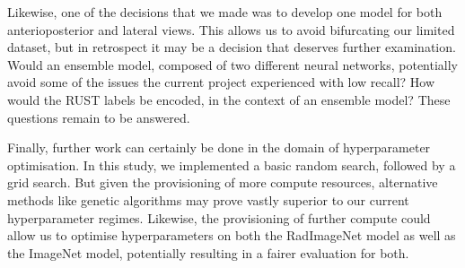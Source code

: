 Likewise, one of the decisions that we made was to develop one model for both anterioposterior and lateral views. This allows us to avoid bifurcating our limited dataset, but in retrospect it may be a decision that deserves further examination. Would an ensemble model, composed of two different neural networks, potentially avoid some of the issues the current project experienced with low recall? How would the RUST labels be encoded, in the context of an ensemble model? These questions remain to be answered.

Finally, further work can certainly be done in the domain of hyperparameter optimisation. In this study, we implemented a basic random search, followed by a grid search. But given the provisioning of more compute resources, alternative methods like genetic algorithms may prove vastly superior to our current hyperparameter regimes. Likewise, the provisioning of further compute could allow us to optimise hyperparameters on both the RadImageNet model as well as the ImageNet model, potentially resulting in a fairer evaluation for both.